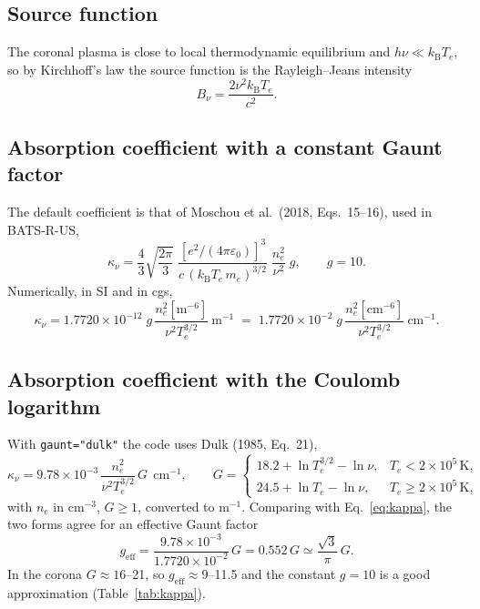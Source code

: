 \documentclass[11pt,a4paper]{article}
\newcommand{\code}[1]{\texttt{#1}}
\newcommand{\kB}{k_\mathrm{B}}
\begin{document}
\subsection{Source function}
The coronal plasma is close to local thermodynamic equilibrium and $h\nu\ll\kB T_e$, so by
Kirchhoff's law the source function is the Rayleigh--Jeans intensity
\begin{equation}
  B_\nu=\frac{2\nu^2\kB T_e}{c^2}.
  \label{eq:rj}
\end{equation}

\subsection{Absorption coefficient with a constant Gaunt factor}
The default coefficient is that of Moschou et al.\ (2018, Eqs.~15--16), used in BATS-R-US,
\begin{equation}
  \kappa_\nu=\frac43\sqrt{\frac{2\pi}{3}}\;
    \frac{\left[e^2/(4\pi\varepsilon_0)\right]^3}{c\,(\kB T_e\,m_e)^{3/2}}\;
    \frac{n_e^2}{\nu^2}\;g,\qquad g=10 .
  \label{eq:kappa}
\end{equation}
Numerically, in SI and in cgs,
\begin{equation}
  \kappa_\nu=1.7720\times10^{-12}\;g\,\frac{n_e^2[\text{m}^{-6}]}{\nu^2T_e^{3/2}}\ \text{m}^{-1}
  \;=\;1.7720\times10^{-2}\;g\,\frac{n_e^2[\text{cm}^{-6}]}{\nu^2T_e^{3/2}}\ \text{cm}^{-1}.
\end{equation}

\subsection{Absorption coefficient with the Coulomb logarithm}
With \code{gaunt="dulk"} the code uses Dulk (1985, Eq.~21),
\begin{equation}
  \kappa_\nu=9.78\times10^{-3}\,\frac{n_e^2}{\nu^2T_e^{3/2}}\,G\ \ \text{cm}^{-1},\qquad
  G=\begin{cases}18.2+\ln T_e^{3/2}-\ln\nu, & T_e<2\times10^5\,\text{K},\\
                 24.5+\ln T_e-\ln\nu, & T_e\ge2\times10^5\,\text{K},\end{cases}
  \label{eq:dulk}
\end{equation}
with $n_e$ in cm$^{-3}$, $G\ge1$, converted to m$^{-1}$. Comparing with Eq.~\eqref{eq:kappa},
the two forms agree for an effective Gaunt factor
\begin{equation}
  g_\text{eff}=\frac{9.78\times10^{-3}}{1.7720\times10^{-2}}\,G=0.552\,G\simeq\frac{\sqrt3}{\pi}\,G .
\end{equation}
In the corona $G\approx16$--21, so $g_\text{eff}\approx9$--11.5 and the constant $g=10$ is a good
approximation (Table~\ref{tab:kappa}).
\end{document}
